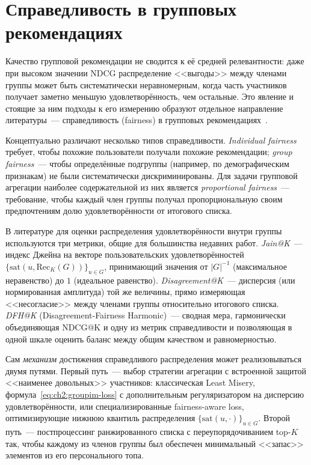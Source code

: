 \section{Справедливость в групповых рекомендациях}
\label{sec:ch2:fairness}

Качество групповой рекомендации не сводится к её средней релевантности: даже при высоком значении NDCG распределение <<выгоды>> между членами группы может быть систематически неравномерным, когда часть участников получает заметно меньшую удовлетворённость, чем остальные. Это явление и стоящие за ним подходы к его измерению образуют отдельное направление литературы~--- справедливость (fairness) в групповых рекомендациях~\cite{jin2023fairness_survey}.

Концептуально различают несколько типов справедливости. \emph{Individual fairness} требует, чтобы похожие пользователи получали похожие рекомендации; \emph{group fairness}~--- чтобы определённые подгруппы (например, по демографическим признакам) не были систематически дискриминированы. Для задачи групповой агрегации наиболее содержательной из них является \emph{proportional fairness}~--- требование, чтобы каждый член группы получал пропорциональную своим предпочтениям долю удовлетворённости от итогового списка.

В литературе для оценки распределения удовлетворённости внутри группы используются три метрики, общие для большинства недавних работ. \emph{Jain@K}~--- индекс Джейна на векторе пользовательских удовлетворённостей $\{\mathrm{sat}(u, \mathrm{Rec}_K(G))\}_{u \in G}$, принимающий значения от $|G|^{-1}$ (максимальное неравенство) до $1$ (идеальное равенство). \emph{Disagreement@K}~--- дисперсия (или нормированная амплитуда) той же величины, прямо измеряющая <<несогласие>> между членами группы относительно итогового списка. \emph{DFH@K} (Disagreement-Fairness Harmonic)~--- сводная мера, гармонически объединяющая NDCG@K и одну из метрик справедливости и позволяющая в одной шкале оценить баланс между общим качеством и равномерностью.

Сам \emph{механизм} достижения справедливого распределения может реализовываться двумя путями. Первый путь~--- выбор стратегии агрегации с встроенной защитой <<наименее довольных>> участников: классическая Least Misery, формула~\eqref{eq:ch2:groupim-loss} с дополнительным регуляризатором на дисперсию удовлетворённости, или специализированные fairness-aware loss, оптимизирующие нижнюю квантиль распределения $\{\mathrm{sat}(u, \cdot)\}_{u \in G}$. Второй путь~--- постпроцессинг ранжированного списка с переупорядочиванием top-$K$ так, чтобы каждому из членов группы был обеспечен минимальный <<запас>> элементов из его персонального топа.

